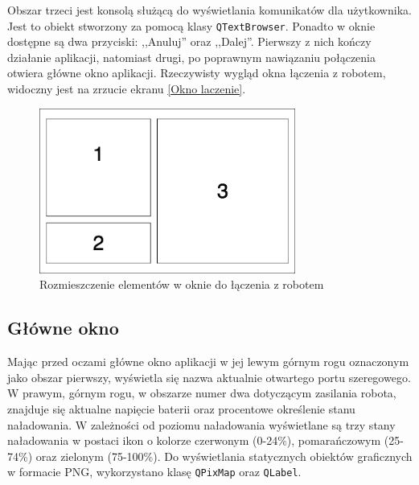 Obszar trzeci jest konsolą służącą do wyświetlania komunikatów dla użytkownika. Jest to obiekt stworzony za pomocą klasy \texttt{QTextBrowser}. Ponadto w oknie dostępne są dwa przyciski: ,,Anuluj'' oraz ,,Dalej''. Pierwszy z nich kończy działanie aplikacji, natomiast drugi, po poprawnym nawiązaniu połączenia otwiera główne okno aplikacji. Rzeczywisty wygląd okna łączenia z robotem, widoczny jest na zrzucie ekranu \ref{Okno laczenie}.

\begin{figure}[h!]
    \centering
    \includegraphics[width=0.75\textwidth]{Rysunki/Rozdzial06/Laczenie_okno_koncepcja.png}
    \caption{Rozmieszczenie elementów w oknie do łączenia z robotem}
    \label{Okno laczenie koncepcja}
\end{figure}

\subsection{Główne okno}

Mając przed oczami główne okno aplikacji w jej lewym górnym rogu oznaczonym jako obszar pierwszy, wyświetla się nazwa aktualnie otwartego portu szeregowego. W prawym, górnym rogu, w obszarze numer dwa dotyczącym zasilania robota, znajduje się aktualne napięcie baterii oraz procentowe określenie stanu naładowania. W zależności od poziomu naładowania wyświetlane są trzy stany naładowania w postaci ikon o kolorze czerwonym (0-24\%), pomarańczowym (25-74\%) oraz zielonym (75-100\%). Do wyświetlania statycznych obiektów graficznych w formacie PNG, wykorzystano klasę \texttt{QPixMap} oraz \texttt{QLabel}.

